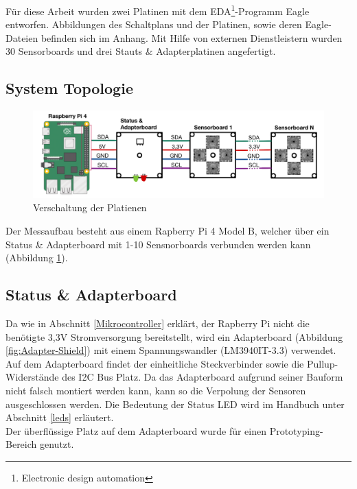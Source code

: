 Für diese Arbeit wurden zwei Platinen mit dem EDA\footnote{Electronic design automation}-Programm Eagle entworfen.
Abbildungen des Schaltplans und der Platinen, sowie deren Eagle-Dateien befinden sich im Anhang.
Mit Hilfe von externen Dienstleistern wurden 30 Sensorboards und drei Stauts \& Adapterplatinen angefertigt.

\subsection{System Topologie}
\begin{figure}[H]
\centering
\includegraphics[width=1\textwidth]{img/System-Topologie.png}
\caption{Verschaltung der Platienen \cite{raspberrypi_fundation}}
\label{fig:Verschaltung_der_P}
\end{figure}

Der Messaufbau besteht aus einem Rapberry Pi 4 Model B, welcher über ein Status \& Adapterboard mit 1-10 Sensnorboards verbunden werden kann (Abbildung \ref{fig:Verschaltung_der_P}).


\subsection{Status \& Adapterboard}
Da wie in Abschnitt \ref{Mikrocontroller} erklärt, der Rapberry Pi nicht die benötigte 3,3V Stromversorgung bereitstellt, wird ein Adapterboard (Abbildung \ref{fig:Adapter-Shield}) mit einem Spannungswandler (LM3940IT-3.3) verwendet.
Auf dem Adapterboard findet der einheitliche Steckverbinder sowie die Pullup-Widerstände des I2C Bus Platz. Da das Adapterboard aufgrund seiner Bauform nicht falsch montiert werden kann, kann so die Verpolung der Sensoren ausgeschlossen werden.
Die Bedeutung der Status LED wird im Handbuch unter Abschnitt \ref{leds} erläutert.\\ 
Der überflüssige Platz auf dem Adapterboard wurde für einen Prototyping-Bereich genutzt.

